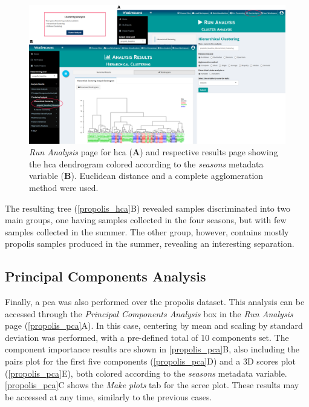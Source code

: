 \begin{figure}[H]
	\centering
	\includegraphics[width=1\linewidth]{Imagens/Propolis/hca}
	\caption{\textit{Run Analysis} page for \gls{hca} (\textbf{A}) and respective results page showing the \gls{hca} dendrogram colored according to the \textit{seasons} metadata variable (\textbf{B}). Euclidean distance and a complete agglomeration method were used.}
	\label{propolis_hca}
\end{figure}

The resulting tree (\autoref{propolis_hca}B) revealed samples discriminated into two main groups, one having samples collected in the four seasons, but with few samples collected in the summer. The other group, however, contains mostly propolis samples produced in the summer, revealing an interesting separation.


\subsection{Principal Components Analysis}

Finally, a \gls{pca} was also performed over the propolis dataset. This analysis can be accessed through the \textit{Principal Components Analysis} box in the \textit{Run Analysis} page (\autoref{propolis_pca}A). 
In this case, centering by mean and scaling by standard deviation was performed, with a pre-defined total of 10 components set. The component importance results are shown in \autoref{propolis_pca}B, also including the pairs plot for the first five components (\autoref{propolis_pca}D) and a 3D scores plot (\autoref{propolis_pca}E), both colored according to the \textit{seasons} metadata variable. \autoref{propolis_pca}C shows the \textit{Make plots} tab for the scree plot. These results may be accessed at any time, similarly to the previous cases.


